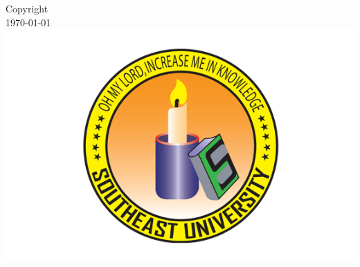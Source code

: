 \documentclass[12pt]{report} %
\begin{document}
\begin{titlepage}


\ifx
\textregistered\textcopyright
\sffamily\textregistered\textcopyright
\fi

Copyright\\
\today\\[1cm]

\includegraphics{logo.png}\\[1cm] %
 

\vfill %

\end{titlepage}


\end{document}
